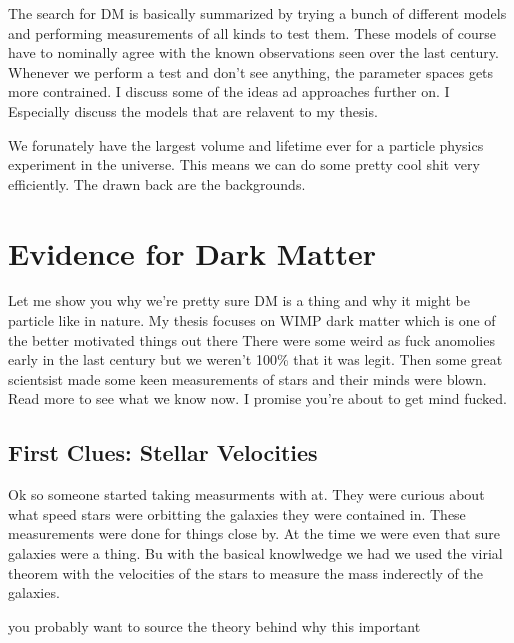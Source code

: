 The search for DM is basically summarized by trying a bunch of different models and performing measurements of all kinds to test them.
These models of course have to nominally agree with the known observations seen over the last century.
Whenever we perform a test and don't see anything, the parameter spaces gets more contrained.
I discuss some of the ideas ad approaches further on.
I Especially discuss the models that are relavent to my thesis.

We forunately have the largest volume and lifetime ever for a particle physics experiment in the universe.
This means we can do some pretty cool shit very efficiently.
The drawn back are the backgrounds.

\section{Evidence for Dark Matter\label{sec:evidence4dm}}

Let me show you why we're pretty sure DM is a thing and why it might be particle like in nature.
My thesis focuses on WIMP dark matter which is one of the better motivated things out there
There were some weird as fuck anomolies early in the last century but we weren't 100\% that it was legit.
Then some great scientsist made some keen measurements of stars and their minds were blown.
Read more to see what we know now.
I promise you're about to get mind fucked.

\subsection{First Clues: Stellar Velocities\label{sec:ev4dm_stars}}
Ok so someone \fu \ns started taking measurments with at.
They were curious about what speed stars were orbitting the galaxies they were contained in.
These measurements were done for things close by.
At the time we were even that sure galaxies were a thing.
Bu with the basical knowlwedge we had we used the virial theorem with the velocities of the stars to measure the mass inderectly of the galaxies.


\ns you probably want to source the theory behind why this important


